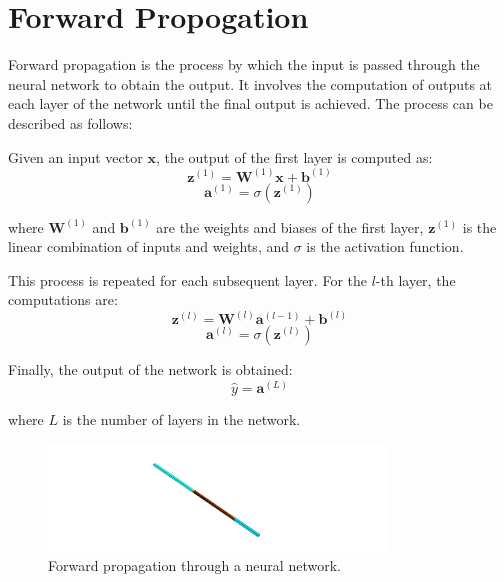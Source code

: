 \documentclass{report}
\begin{document}
    \section{Forward Propogation}
        Forward propagation is the process by which the input is passed through the neural network to obtain the output. It involves the computation of outputs at each layer of the network until the final output is achieved. The process can be described as follows:

        Given an input vector \( \mathbf{x} \), the output of the first layer is computed as:
        \begin{equation}
        \mathbf{z}^{(1)} = \mathbf{W}^{(1)} \mathbf{x} + \mathbf{b}^{(1)}
        \end{equation}
        \begin{equation}
        \mathbf{a}^{(1)} = \sigma(\mathbf{z}^{(1)})
        \end{equation}
        
        where \( \mathbf{W}^{(1)} \) and \( \mathbf{b}^{(1)} \) are the weights and biases of the first layer, \( \mathbf{z}^{(1)} \) is the linear combination of inputs and weights, and \( \sigma \) is the activation function.
        
        This process is repeated for each subsequent layer. For the \( l \)-th layer, the computations are:
        \begin{equation}
        \mathbf{z}^{(l)} = \mathbf{W}^{(l)} \mathbf{a}^{(l-1)} + \mathbf{b}^{(l)}
        \end{equation}
        \begin{equation}
        \mathbf{a}^{(l)} = \sigma(\mathbf{z}^{(l)})
        \end{equation}
        
        Finally, the output of the network is obtained:
        \begin{equation}
        \hat{y} = \mathbf{a}^{(L)}
        \end{equation}
        
        where \( L \) is the number of layers in the network.
        
        \begin{figure}[h]
            \centering
            \includegraphics[width=0.8\textwidth]{00_Images/00_Velocity.png}
            \caption{Forward propagation through a neural network.}
            \label{fig:forward_propagation}
        \end{figure}
        
\end{document}
